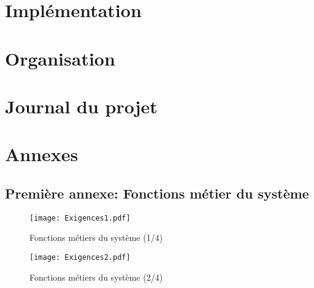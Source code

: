\documentclass[12pt,fleqn]{book} %
\begin{document}
\part{Implémentation}

%
% 


%
%

\part{Organisation}


\part{Journal du projet}



\appendix
\part{Annexes}
\chapter{Première annexe: Fonctions métier du système}

\begin{figure}[h!]
\centering\texttt{[image: Exigences1.pdf]}
\caption{\label{fig:exi1} Fonctions métiers du système (1/4)}
\end{figure}

\begin{figure}[h!]
\centering\texttt{[image: Exigences2.pdf]}
\caption{\label{fig:exi2} Fonctions métiers du système (2/4)}
\end{figure}
\end{document}
